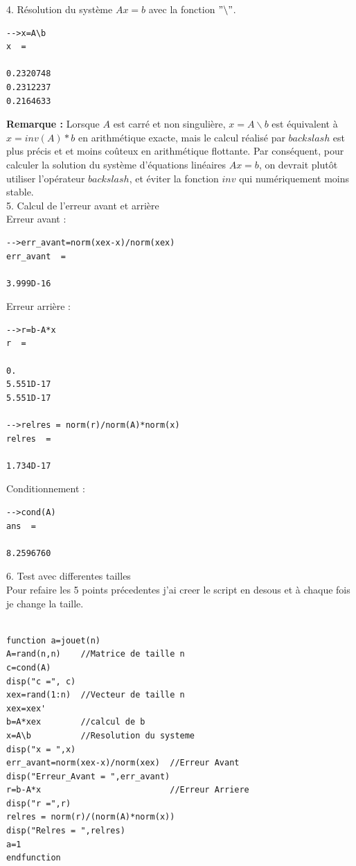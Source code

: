 \documentclass[12pt]{report}
\begin{document}
4. Résolution du système $Ax=b$ avec la fonction $"\backslash"$.
\begin{lstlisting}[]
-->x=A\b
x  = 

0.2320748
0.2312237
0.2164633  
\end{lstlisting}  

\textbf{Remarque :} Lorsque $A$ est carré et non singulière, $x=A\backslash b $ est équivalent à $x=inv(A)*b$ en arithmétique exacte, mais le calcul réalisé par $backslash$ est plus précis et et moins coûteux en arithmétique flottante. Par conséquent, pour calculer la solution du système d'équations linéaires $Ax=b$, on devrait plutôt utiliser l'opérateur $backslash$, et éviter la fonction $inv$ qui numériquement moins stable.\\

5. Calcul de l'erreur avant et arrière \\

Erreur avant :
\begin{lstlisting}[]
-->err_avant=norm(xex-x)/norm(xex)
err_avant  = 

3.999D-16
\end{lstlisting}

Erreur arrière : 
\begin{lstlisting}
-->r=b-A*x
r  = 

0.       
5.551D-17
5.551D-17

-->relres = norm(r)/norm(A)*norm(x)
relres  = 

1.734D-17
\end{lstlisting}

Conditionnement :           
\begin{lstlisting}
-->cond(A)
ans  =

8.2596760 
\end{lstlisting}           
          
6. Test avec differentes tailles\\
Pour refaire les 5 points précedentes j'ai creer le script en desous et à chaque fois je change la taille.  
\begin{lstlisting}

function a=jouet(n)
A=rand(n,n)    //Matrice de taille n
c=cond(A)
disp("c =", c)
xex=rand(1:n)  //Vecteur de taille n
xex=xex'
b=A*xex        //calcul de b
x=A\b          //Resolution du systeme
disp("x = ",x)
err_avant=norm(xex-x)/norm(xex)  //Erreur Avant
disp("Erreur_Avant = ",err_avant)
r=b-A*x                          //Erreur Arriere
disp("r =",r)
relres = norm(r)/(norm(A)*norm(x))
disp("Relres = ",relres)
a=1
endfunction
\end{lstlisting}     
\end{document}
